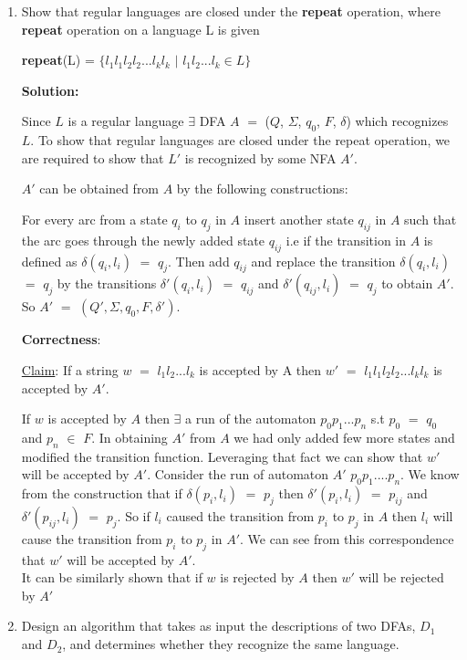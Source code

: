 \documentclass[11pt]{article}
\begin{document}
\begin{enumerate}[1.]
    
    
    \item Show that regular languages are closed under the \textbf{repeat} operation, where \textbf{repeat} operation on a language L is given  \begin{center}
    {\textbf{repeat}(L) = $\{l_1l_1l_2l_2...l_kl_k$ $|$ $ l_1l_2...l_k \in L\}$}
    \end{center}
    
    \textbf{Solution:}
    
    Since $L$ is a regular language $\exists$ DFA $A$ $=$ ($Q$, $\Sigma$, $q_0$, $F$, $\delta$) which recognizes $L$.
    To show that regular languages are closed under the repeat operation, we are required to show that $L'$ is recognized by some NFA $A'$.
    
    $A'$ can be obtained from $A$ by the following constructions:
    
    For every arc from a state $q_i$ to $q_j$ in $A$ insert another state $q_{ij}$ in $A$ such that the arc goes through the newly added state $q_{ij}$ i.e if the transition in $A$ is defined as $\delta (q_i, l_i)$ $=$ $q_j$. Then add $q_{ij}$ and replace the transition $\delta (q_i, l_i)$ $=$ $q_j$ by the transitions $\delta' (q_i, l_i)$ $=$ $q_{ij}$ and $\delta' (q_{ij}, l_i)$ $=$ $q_j$ to obtain $A'$. So $A'$ $=$ $(Q', \Sigma, q_0, F, \delta')$.
    
    \textbf{Correctness}:
    
     \underline{Claim}: If a string $w$ $=$ $l_1l_2...l_k$ is accepted by A then $w'$ $=$ $l_1l_1l_2l_2...l_kl_k$ is accepted by $A'$.
        
        If $w$ is accepted by $A$ then $\exists$ a run of the automaton $p_0p_1...p_n$ s.t 
        $p_0$ $=$ $q_0$ and $p_n$ $\in$ $F$. In obtaining $A'$ from $A$ we had only added few more states and modified the transition function. Leveraging that fact we can show that $w'$ will be accepted by $A'$. Consider the run of automaton $A'$ $p_0p_1....p_n$. We know from the construction that if $\delta (p_i, l_i)$ $=$ $p_j$ then $\delta' (p_i, l_i)$ $=$ $p_{ij}$ and $\delta' (p_{ij}, l_i)$ $=$ $p_j$. So if $l_i$ caused the transition from $p_i$ to $p_j$ in $A$ then $l_i$ will cause the transition from $p_i$ to $p_j$ in $A'$. We can see from this correspondence that $w'$ will be accepted by $A'$.\\
        It can be similarly shown that if $w$ is rejected by $A$ then $w'$ will be rejected by $A'$
    
    
    \item Design an algorithm that takes as input the descriptions of two DFAs, $D_1$ and $D_2$, and determines whether they recognize the same language.
    

\end{enumerate}
\end{document}
